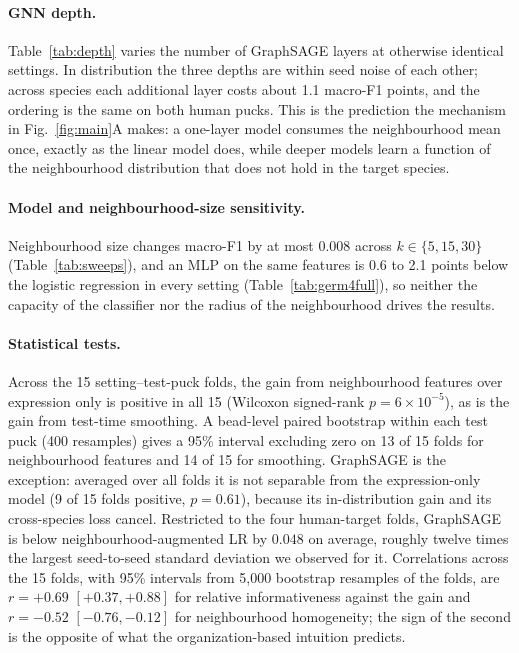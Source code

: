\paragraph{GNN depth.} Table~\ref{tab:depth} varies the number of GraphSAGE layers at otherwise identical settings. In distribution the three depths are within seed noise of each other; across species each additional layer costs about 1.1 macro-F1 points, and the ordering is the same on both human pucks. This is the prediction the mechanism in Fig.~\ref{fig:main}A makes: a one-layer model consumes the neighbourhood mean once, exactly as the linear model does, while deeper models learn a function of the neighbourhood distribution that does not hold in the target species.

\begin{table}[H]
\centering
\caption{GraphSAGE macro-F1 by depth, germ-cell stage, mean $\pm$ SD over three seeds. All other hyperparameters are unchanged from the main results, in which GraphSAGE has two layers.}
\label{tab:depth}
\small

\end{table}

\paragraph{Model and neighbourhood-size sensitivity.} Neighbourhood size changes macro-F1 by at most 0.008 across $k\in\{5,15,30\}$ (Table~\ref{tab:sweeps}), and an MLP on the same features is 0.6 to 2.1 points below the logistic regression in every setting (Table~\ref{tab:germ4full}), so neither the capacity of the classifier nor the radius of the neighbourhood drives the results.

\paragraph{Statistical tests.} Across the 15 setting--test-puck folds, the gain from neighbourhood features over expression only is positive in all 15 (Wilcoxon signed-rank $p=6\times10^{-5}$), as is the gain from test-time smoothing. A bead-level paired bootstrap within each test puck (400 resamples) gives a 95\% interval excluding zero on 13 of 15 folds for neighbourhood features and 14 of 15 for smoothing. GraphSAGE is the exception: averaged over all folds it is not separable from the expression-only model (9 of 15 folds positive, $p=0.61$), because its in-distribution gain and its cross-species loss cancel. Restricted to the four human-target folds, GraphSAGE is below neighbourhood-augmented LR by $0.048$ on average, roughly twelve times the largest seed-to-seed standard deviation we observed for it. Correlations across the 15 folds, with 95\% intervals from 5{,}000 bootstrap resamples of the folds, are $r=+0.69$ $[+0.37,+0.88]$ for relative informativeness against the gain and $r=-0.52$ $[-0.76,-0.12]$ for neighbourhood homogeneity; the sign of the second is the opposite of what the organization-based intuition predicts.

